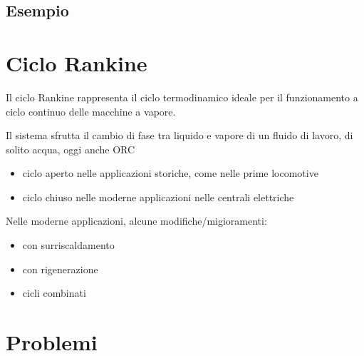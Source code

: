 \documentclass[letterpaper,10pt,italian]{jupyterBook}
\begin{document}
\subsection{Esempio}
\label{\detokenize{ch/thermodynamics/heat-engine-joule-brayton:esempio}}
\sphinxAtStartPar
{}

\sphinxstepscope


\section{Ciclo Rankine}
\label{\detokenize{ch/thermodynamics/heat-engine-rankine:ciclo-rankine}}\label{\detokenize{ch/thermodynamics/heat-engine-rankine:physics-hs-thermodynamics-heat-engine-rankine}}\label{\detokenize{ch/thermodynamics/heat-engine-rankine::doc}}
\sphinxAtStartPar
Il ciclo Rankine rappresenta il ciclo termodinamico ideale per il funzionamento a ciclo continuo delle macchine a vapore.

\sphinxAtStartPar
Il sistema sfrutta il cambio di fase tra liquido e vapore di un fluido di lavoro, di solito acqua, oggi anche ORC
\begin{itemize}
\item {} 
\sphinxAtStartPar
ciclo aperto nelle applicazioni storiche, come nelle prime locomotive

\item {} 
\sphinxAtStartPar
ciclo chiuso nelle moderne applicazioni nelle centrali elettriche

\end{itemize}

\sphinxAtStartPar
Nelle moderne applicazioni, alcune modifiche/migioramenti:
\begin{itemize}
\item {} 
\sphinxAtStartPar
con surriscaldamento

\item {} 
\sphinxAtStartPar
con rigenerazione

\item {} 
\sphinxAtStartPar
cicli combinati

\end{itemize}

\sphinxstepscope


\section{Problemi}
\label{\detokenize{ch/thermodynamics/heat-engine-problems:problemi}}\label{\detokenize{ch/thermodynamics/heat-engine-problems:physics-hs-thermodynamics-heat-engine-problems}}\label{\detokenize{ch/thermodynamics/heat-engine-problems::doc}}
\end{document}
